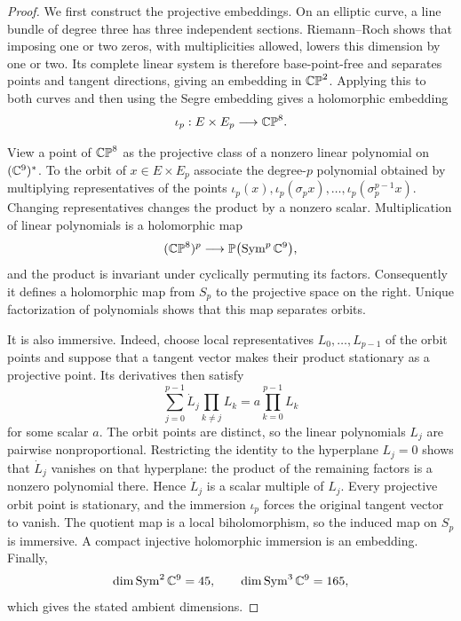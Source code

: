 \begin{proof}
We first construct the projective embeddings. On an elliptic curve, a
line bundle of degree three has three independent sections. Riemann--Roch
shows that imposing one or two zeros, with multiplicities allowed,
lowers this dimension by one or two. Its complete linear system is
therefore base-point-free and separates points and tangent directions,
giving an embedding in $\mathbb{CP}^2$. Applying this to both curves and then
using the Segre embedding gives a holomorphic embedding
\[
 \iota_p:E\times E_p\longrightarrow\mathbb{CP}^8.
\]

View a point of $\mathbb{CP}^8$ as the projective class of a nonzero linear
polynomial on $(\mathbb C^9)^*$. To the orbit of $x\in E\times E_p$ associate
the degree-$p$ polynomial obtained by multiplying representatives of
the points
$\iota_p(x),\iota_p(\sigma_p x),\ldots,
\iota_p(\sigma_p^{p-1}x)$.
Changing representatives changes the product by a nonzero scalar.
Multiplication of linear polynomials is a holomorphic map
\[
 (\mathbb{CP}^8)^p\longrightarrow
 \mathbb P\bigl(\operatorname{Sym}^p\mathbb C^9\bigr),
\]
and the product is invariant under cyclically permuting its factors.
Consequently it defines a holomorphic map from $S_p$ to the projective
space on the right. Unique factorization of polynomials shows that this
map separates orbits.

It is also immersive. Indeed, choose local representatives
$L_0,\ldots,L_{p-1}$ of the orbit points and suppose that a tangent
vector makes their product stationary as a projective point. Its
derivatives then satisfy
\[
 \sum_{j=0}^{p-1}\dot L_j\prod_{k\ne j}L_k
   =a\prod_{k=0}^{p-1}L_k
\]
for some scalar $a$. The orbit points are distinct, so the linear
polynomials $L_j$ are pairwise nonproportional. Restricting the identity
to the hyperplane $L_j=0$ shows that $\dot L_j$ vanishes on that
hyperplane: the product of the remaining factors is a nonzero
polynomial there. Hence $\dot L_j$ is a scalar multiple of $L_j$.
Every projective orbit point is stationary, and the immersion
$\iota_p$ forces the original tangent vector to vanish. The quotient
map is a local biholomorphism, so the induced map on $S_p$ is immersive.
A compact injective holomorphic immersion is an embedding. Finally,
\[
 \dim\operatorname{Sym}^2\mathbb C^9=45,
 \qquad
 \dim\operatorname{Sym}^3\mathbb C^9=165,
\]
which gives the stated ambient dimensions.


\end{proof}
